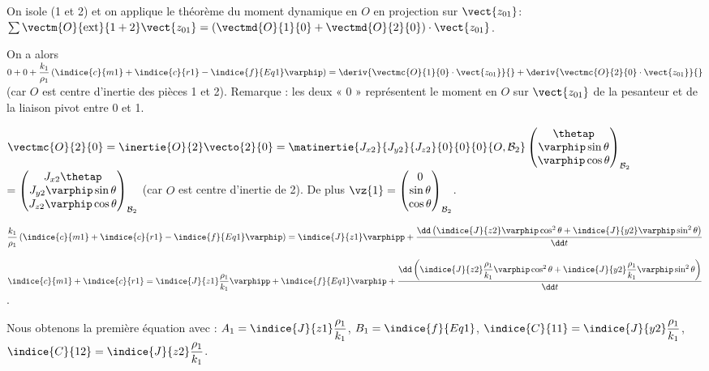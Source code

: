 \ifprof
\begin{corrige}
On isole (1 et 2) et on applique le théorème du moment dynamique en $O$ en projection sur $\vect{z_{01}}$:
$\sum \vectm{O}{\text{ext}}{1+2} \vect{z_{01}}  = \left(\vectmd{O}{1}{0} + \vectmd{O}{2}{0}\right)\cdot \vect{z_{01}}$.

On a alors  
$0+0+\dfrac{k_1}{\rho_1} \left(\indice{c}{m1}+\indice{c}{r1}-\indice{f}{Eq1} \varphip \right)=
\deriv{\vectmc{O}{1}{0}\cdot \vect{z_{01}}}{} + \deriv{\vectmc{O}{2}{0}\cdot \vect{z_{01}}}{}$
(car $O$ est centre d’inertie des pièces 1 et 2). Remarque : les deux « 0 » représentent le moment en $O$ sur $\vect{z_{01}}$ de la pesanteur et de la liaison pivot entre 0 et 1.

$\vectmc{O}{2}{0} = \inertie{O}{2} \vecto{2}{0} 
= \matinertie{J_{x2}}{J_{y2}}{J_{z2}}{0}{0}{0}{O,\mathcal{B}_2} \begin{pmatrix} \thetap \\ \varphip\sin\theta \\ \varphip \cos \theta \end{pmatrix}_{\mathcal{B}_2}$
$=\begin{pmatrix} J_{x2} \thetap \\ J_{y2}\varphip\sin\theta \\ J_{z2}\varphip \cos \theta \end{pmatrix}_{\mathcal{B}_2}$  (car $O$ est centre d’inertie de 2). De plus $\vz{1}=\begin{pmatrix} 0 \\ \sin\theta \\ \cos \theta \end{pmatrix}_{\mathcal{B}_2}$.

$\dfrac{k_1}{\rho_1} \left(\indice{c}{m1}  +\indice{c}{r1}  -\indice{f}{Eq1} \varphip \right)=\indice{J}{z1} \varphipp+\dfrac{\dd \left(\indice{J}{z2} \varphip  \cos^2 \theta+\indice{J}{y2} \varphip \sin^2 \theta\right)}{\dd t}$
  
$\indice{c}{m1}  +\indice{c}{r1}  =\indice{J}{z1}\dfrac{\rho_1}{k_1}\varphipp+\indice{f}{Eq1} \varphip+\dfrac{\dd \left(
\indice{J}{z2}\dfrac{\rho_1}{k_1}\varphip \cos^2 \theta+\indice{J}{y2}\dfrac{\rho_1}{k_1}\varphip \sin^2 \theta \right)}{\dd t}$.

Nous obtenons la première équation avec : $A_1=\indice{J}{z1}\dfrac{\rho_1}{k_1}$, $B_1=\indice{f}{Eq1}$, $\indice{C}{11}=\indice{J}{y2}\dfrac{\rho_1}{k_1}$, $\indice{C}{12}=\indice{J}{z2}\dfrac{\rho_1}{k_1}$.  

\vspace{1cm}


\end{corrige}

